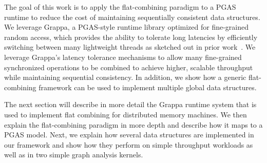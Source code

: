The goal of this work is to apply the flat-combining paradigm to a PGAS runtime to reduce the cost of maintaining sequentially consistent data structures.
We leverage Grappa, a PGAS-style runtime library optimized for fine-grained random access, which provides the ability to tolerate long latencies by efficiently switching between many lightweight threads as sketched out in prior work~\cite{Nelson:hotpar11-real}.
We leverage Grappa's latency tolerance mechanisms to allow many fine-grained synchronized operations to be combined to achieve higher, scalable throughput while maintaining sequential consistency.
In addition, we show how a generic flat-combining framework can be used to implement multiple global data structures.

The next section will describe in more detail the Grappa runtime system that is used to implement flat combining for distributed memory machines. We then explain the flat-combining paradigm in more depth and describe how it maps to a PGAS model. Next, we explain how several data structures are implemented in our framework and show how they perform on simple throughput workloads as well as in two simple graph analysis kernels.
